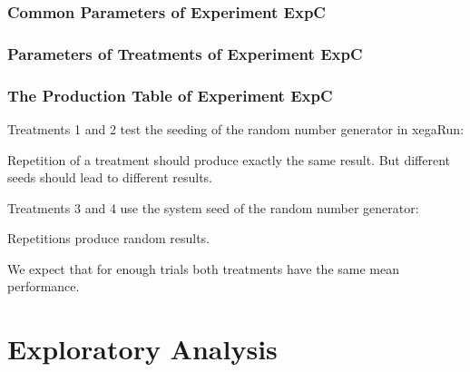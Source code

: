 \documentclass[18pt,c]{beamer}
\makeatletter
\let\beamer@writeslidentry@miniframeson=\beamer@writeslidentry
\newcommand*{\miniframeson}{\let\beamer@writeslidentry=\beamer@writeslidentry@miniframeson}
\makeatother
\begin{document}
 \begin{frame}
 \fontsize{8pt}{9pt}\selectfont
 \frametitle{ Common Parameters of Experiment ExpC }

 \label{ExpCCommonTable001.tex}  
 \end{frame}

 \begin{frame}
 \fontsize{8pt}{9pt}\selectfont
 \frametitle{ Parameters of Treatments of Experiment ExpC }

 \label{ExpCDifferentTable000.tex}  
 \end{frame}

 \begin{frame}
 \fontsize{8pt}{9pt}\selectfont
 \frametitle{ The Production Table of Experiment ExpC }

 \label{ExpCGrammarTable000.tex}  
 \end{frame}

\begin{frame}
\vspace*{2mm}
\begin{block}{

}
Treatments 1 and 2 test the seeding of the random number generator in xegaRun:
 
Repetition of a treatment should produce exactly the same result.
But different seeds should lead to different results.
 
Treatments 3 and 4 use the system seed of the random number generator:
 
Repetitions produce random results.
 
We expect that for enough trials both treatments have the same mean performance.
\end{block}
\end{frame}%
\miniframeson
\section{Exploratory Analysis}
\miniframeson
\end{document}
